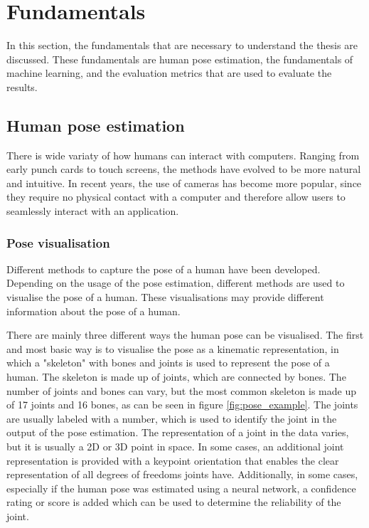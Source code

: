 \section{Fundamentals}
\label{sec:fundamentals}
In this section, the fundamentals that are necessary to understand the thesis are discussed. These fundamentals are human pose estimation, the fundamentals of machine learning, and the evaluation metrics that are used to evaluate the results. 

\subsection{Human pose estimation}

There is wide variaty of how humans can interact with computers. Ranging from early punch cards to touch screens, the methods have evolved to be more natural and intuitive. In recent years, the use of cameras has become more popular, since they require no physical contact with a computer and therefore allow users to seamlessly interact with an application.

\subsubsection{Pose visualisation}

Different methods to capture the pose of a human have been developed. Depending on the usage of the pose estimation, different methods are used to visualise the pose of a human. These visualisations may provide different information about the pose of a human.

There are mainly three different ways the human pose can be visualised. The first and most basic way is to visualise the pose as a kinematic representation, in which a "skeleton" with bones and joints is used to represent the pose of a human. The skeleton is made up of joints, which are connected by bones. The number of joints and bones can vary, but the most common skeleton is made up of 17 joints and 16 bones, as can be seen in figure \ref{fig:pose_example}. The joints are usually labeled with a number, which is used to identify the joint in the output of the pose estimation. The representation of a joint in the data varies, but it is usually a 2D or 3D point in space. In some cases, an additional joint representation is provided with a keypoint orientation that enables the clear representation of all degrees of freedoms joints have\cite{KeypointOrientation}. Additionally, in some cases, especially if the human pose was estimated using a neural network, a confidence rating or score is added which can be used to determine the reliability of the joint.

